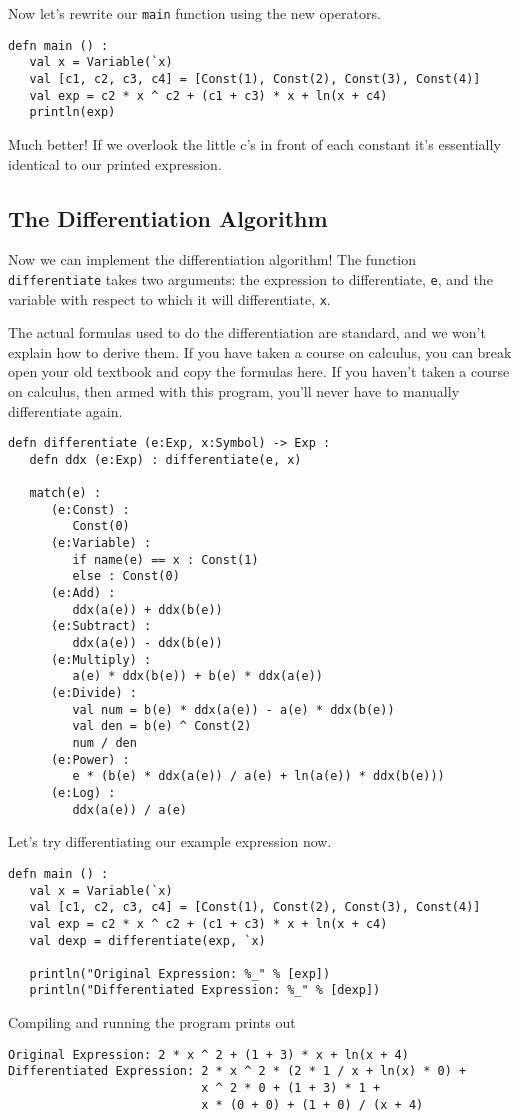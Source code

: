 \documentclass[10pt,oneside]{book}
\begin{document}
Now let's rewrite our \texttt{\frenchspacing main} function using the new operators.
\begin{lstlisting}
defn main () :
   val x = Variable(`x)
   val [c1, c2, c3, c4] = [Const(1), Const(2), Const(3), Const(4)]
   val exp = c2 * x ^ c2 + (c1 + c3) * x + ln(x + c4)
   println(exp)
\end{lstlisting}
Much better! If we overlook the little c's in front of each constant it's essentially identical to our printed expression.

\subsection*{The Differentiation Algorithm}
Now we can implement the differentiation algorithm! The function \texttt{\frenchspacing differentiate} takes two arguments: the expression to differentiate, \texttt{\frenchspacing e}, and the variable with respect to which it will differentiate, \texttt{\frenchspacing x}. 

The actual formulas used to do the differentiation are standard, and we won't explain how to derive them. If you have taken a course on calculus, you can break open your old textbook and copy the formulas here. If you haven't taken a course on calculus, then armed with this program, you'll never have to manually differentiate again. 
\begin{lstlisting}
defn differentiate (e:Exp, x:Symbol) -> Exp :
   defn ddx (e:Exp) : differentiate(e, x)
   
   match(e) :
      (e:Const) :
         Const(0)
      (e:Variable) :
         if name(e) == x : Const(1)
         else : Const(0)
      (e:Add) :
         ddx(a(e)) + ddx(b(e))
      (e:Subtract) :
         ddx(a(e)) - ddx(b(e))
      (e:Multiply) :
         a(e) * ddx(b(e)) + b(e) * ddx(a(e))
      (e:Divide) :
         val num = b(e) * ddx(a(e)) - a(e) * ddx(b(e))
         val den = b(e) ^ Const(2)
         num / den
      (e:Power) :
         e * (b(e) * ddx(a(e)) / a(e) + ln(a(e)) * ddx(b(e)))
      (e:Log) :
         ddx(a(e)) / a(e)
\end{lstlisting}

Let's try differentiating our example expression now. 
\begin{lstlisting}
defn main () :
   val x = Variable(`x)
   val [c1, c2, c3, c4] = [Const(1), Const(2), Const(3), Const(4)]
   val exp = c2 * x ^ c2 + (c1 + c3) * x + ln(x + c4)
   val dexp = differentiate(exp, `x)
   
   println("Original Expression: %_" % [exp])
   println("Differentiated Expression: %_" % [dexp])
\end{lstlisting}
Compiling and running the program prints out
\begin{lstlisting}
Original Expression: 2 * x ^ 2 + (1 + 3) * x + ln(x + 4)
Differentiated Expression: 2 * x ^ 2 * (2 * 1 / x + ln(x) * 0) +
                           x ^ 2 * 0 + (1 + 3) * 1 +
                           x * (0 + 0) + (1 + 0) / (x + 4)
\end{lstlisting}
\end{document}
